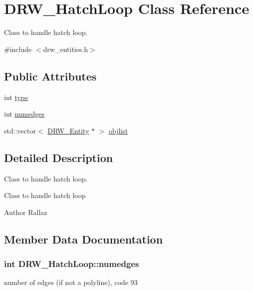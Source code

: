 \hypertarget{class_d_r_w___hatch_loop}{}\section{D\+R\+W\+\_\+\+Hatch\+Loop Class Reference}
\label{class_d_r_w___hatch_loop}


Class to handle hatch loop.  




{\ttfamily \#include $<$drw\+\_\+entities.\+h$>$}

\subsection*{Public Attributes}
\begin{DoxyCompactItemize}
\item 
int \hyperlink{class_d_r_w___hatch_loop_a5891fcfa111b70221bc04c629bd6286d}{type}
\item 
int \hyperlink{class_d_r_w___hatch_loop_a48586ffbf48389a849e47c7d2412a280}{numedges}
\item 
std\+::vector$<$ \hyperlink{class_d_r_w___entity}{D\+R\+W\+\_\+\+Entity} $\ast$ $>$ \hyperlink{class_d_r_w___hatch_loop_afbd7d0876386234348fa0a301051d601}{objlist}
\end{DoxyCompactItemize}


\subsection{Detailed Description}
Class to handle hatch loop. 

Class to handle hatch loop \begin{DoxyAuthor}{Author}
Rallaz 
\end{DoxyAuthor}


\subsection{Member Data Documentation}
\hypertarget{class_d_r_w___hatch_loop_a48586ffbf48389a849e47c7d2412a280}{}
\subsubsection[{numedges}]{\setlength{\rightskip}{0pt plus 5cm}int D\+R\+W\+\_\+\+Hatch\+Loop\+::numedges}\label{class_d_r_w___hatch_loop_a48586ffbf48389a849e47c7d2412a280}
number of edges (if not a polyline), code 93 \hypertarget{class_d_r_w___hatch_loop_afbd7d0876386234348fa0a301051d601}{}
